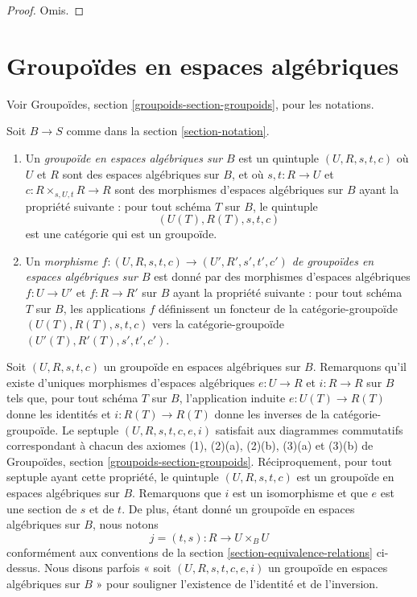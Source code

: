 \begin{proof}
Omis.
\end{proof}





\section{Groupoïdes en espaces algébriques}
\label{section-groupoids}

\noindent
Voir Groupoïdes, section \ref{groupoids-section-groupoids}, pour les notations.

\begin{definition}
\label{definition-groupoid}
Soit $B \to S$ comme dans la section \ref{section-notation}.
\begin{enumerate}
\item Un {\it groupoïde en espaces algébriques sur $B$} est un quintuple $(U, R, s, t, c)$ où $U$ et $R$ sont des espaces algébriques sur $B$, et où $s, t : R \to U$ et $c : R \times_{s, U, t} R \to R$ sont des morphismes d'espaces algébriques sur $B$ ayant la propriété suivante : pour tout schéma $T$ sur $B$, le quintuple
$$
(U(T), R(T), s, t, c)
$$
est une catégorie qui est un groupoïde.
\item Un {\it morphisme $f : (U, R, s, t, c) \to (U', R', s', t', c')$ de groupoïdes en espaces algébriques sur $B$} est donné par des morphismes d'espaces algébriques $f : U \to U'$ et $f : R \to R'$ sur $B$ ayant la propriété suivante : pour tout schéma $T$ sur $B$, les applications $f$ définissent un foncteur de la catégorie-groupoïde $(U(T), R(T), s, t, c)$ vers la catégorie-groupoïde $(U'(T), R'(T), s', t', c')$.
\end{enumerate}
\end{definition}

\noindent
Soit $(U, R, s, t, c)$ un groupoïde en espaces algébriques sur $B$. Remarquons qu'il existe d'uniques morphismes d'espaces algébriques $e : U \to R$ et $i : R \to R$ sur $B$ tels que, pour tout schéma $T$ sur $B$, l'application induite $e : U(T) \to R(T)$ donne les identités et $i : R(T) \to R(T)$ donne les inverses de la catégorie-groupoïde. Le septuple $(U, R, s, t, c, e, i)$ satisfait aux diagrammes commutatifs correspondant à chacun des axiomes (1), (2)(a), (2)(b), (3)(a) et (3)(b) de Groupoïdes, section \ref{groupoids-section-groupoids}. Réciproquement, pour tout septuple ayant cette propriété, le quintuple $(U, R, s, t, c)$ est un groupoïde en espaces algébriques sur $B$. Remarquons que $i$ est un isomorphisme et que $e$ est une section de $s$ et de $t$. De plus, étant donné un groupoïde en espaces algébriques sur $B$, nous notons
$$
j = (t, s) : R \longrightarrow U \times_B U
$$
conformément aux conventions de la section \ref{section-equivalence-relations} ci-dessus. Nous disons parfois « soit $(U, R, s, t, c, e, i)$ un groupoïde en espaces algébriques sur $B$ » pour souligner l'existence de l'identité et de l'inversion.

